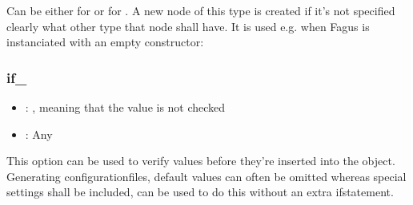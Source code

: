 \documentclass[a4paper,10pt,english]{sphinxmanual}
\begin{document}
\sphinxAtStartPar
Can be either  for  or  for . A new node of this type is created if it’s not specified clearly what other type that node shall have. It is used e.g. when Fagus is instanciated with an empty constructor:

\begin{sphinxVerbatim}[commandchars=\\\{\},numbers=left,firstnumber=1,stepnumber=1]
  
  
  
 
  
  
\end{sphinxVerbatim}


\subsubsection{if\_}
\label{\detokenize{README:if}}\begin{itemize}
\item {}
\sphinxAtStartPar
{}: , meaning that the value is not checked

\item {}
\sphinxAtStartPar
{}: Any

\end{itemize}

\sphinxAtStartPar
This option can be used to verify values before they’re inserted into the \sphinxhyphen{}object. Generating configuration\sphinxhyphen{}files, default values can often be omitted whereas special settings shall be included,  can be used to do this without an extra if\sphinxhyphen{}statement.
\end{document}
